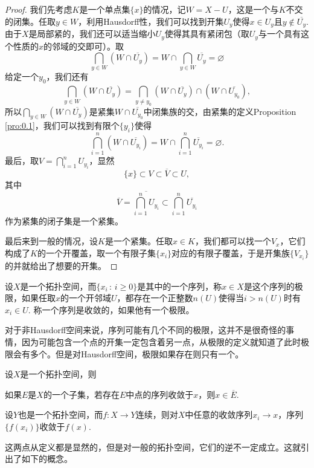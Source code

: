 \begin{proof}
我们先考虑$K$是一个单点集$\{x\}$的情况，记$W=X-U$，这是一个与$K$不交的闭集。任取$y\in W$，利用Hausdorff性，我们可以找到开集$U_y$使得$x\in U_y$且$y\not\in \overline{U_y}$. 由于$X$是局部紧的，我们还可以适当缩小$U_y$使得其具有紧闭包（取$U_y$与一个具有这个性质的$x$的邻域的交即可）。取
\[
	\bigcap_{y\in W} (W\cap\overline{U_y})=W\cap \bigcap_{y\in W} \overline{U_y}=\varnothing
\]
给定一个$y_0$，我们还有
\[
	\bigcap_{y\in W} (W\cap\overline{U_y})=\bigcap_{y\neq y_0} (W\cap\overline{U_y})\cap (W\cap\overline{U_{y_0}}),
\]
所以$\bigcap_{y\in W} (W\cap\overline{U_y})$是紧集$W\cap\overline{U_{y_0}}$中闭集族的交，由紧集的定义Proposition \ref{pro:0.1}，我们可以找到有限个$\{y_i\}$使得
\[
	\bigcap_{i=1}^n (W\cap\overline{U_{y_i}})=W\cap\bigcap_{i=1}^n \overline{U_{y_i}}=\varnothing.
\]
最后，取$V=\bigcap_{i=1}^n U_{y_i}$，显然
\[
	\{x\}\subset V\subset \overline{V}\subset U,
\]
其中
\[
	\overline{V}=\overline{\bigcap_{i=1}^n U_{y_i}}\subset \bigcap_{i=1}^n \overline{U_{y_i}}
\]
作为紧集的闭子集是一个紧集。

最后来到一般的情况，设$K$是一个紧集。任取$x\in K$，我们都可以找一个$V_x$，它们构成了$K$的一个开覆盖，取一个有限子集$\{x_i\}$对应的有限子覆盖，于是开集族$\{V_{x_i}\}$的并就给出了想要的开集。
\end{proof}

\begin{para}[序列的极限]
	设$X$是一个拓扑空间，而$\{x_i\,:\, i\geq 0\}$是其中的一个序列，称$x\in X$是这个序列的极限，如果任取$x$的一个开邻域$U$，都存在一个正整数$n(U)$使得当$i>n(U)$时有$x_i\in U$. 称一个序列是收敛的，如果他有一个极限。

	对于非Hausdorff空间来说，序列可能有几个不同的极限，这并不是很奇怪的事情，因为可能包含一个点的开集一定包含着另一点，从极限的定义就知道了此时极限会有多个。但是对Hausdorff空间，极限如果存在则只有一个。
\end{para}

\begin{lem}\label{1.7}
设$X$是一个拓扑空间，则
\begin{compactenum}[~~~(a)]
\item 如果$E$是$X$的一个子集，若存在$E$中点的序列收敛于$x$，则$x\in \overline{E}$.
\item 设$Y$也是一个拓扑空间，而$f:X\to Y$连续，则对$X$中任意的收敛序列$x_i\to x$，序列$\{f(x_i)\}$收敛于$f(x)$.
\end{compactenum}
\end{lem}

这两点从定义都是显然的，但是对一般的拓扑空间，它们的逆不一定成立。这就引出了如下的概念。

